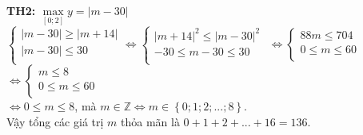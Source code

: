 \begin{ex}
{		\textbf{TH2:} $\max\limits_{[0;2]}y=\left| m-30 \right|$\\
		$\left\{ \begin{matrix}
			\left| m-30 \right|\ge \left| m+14 \right| \\
			\left| m-30 \right|\le 30 \\
		\end{matrix} \right.\Leftrightarrow \left\{ \begin{matrix}
			{{\left| m+14 \right|}^2}\le {{\left| m-30 \right|}^2} \\
			-30\le m-30\le 30 \\
		\end{matrix} \right.$ $\Leftrightarrow \left\{ \begin{matrix}
			88m\le 704 \\
			0\le m\le 60 \\
		\end{matrix} \right.$ $\Leftrightarrow \left\{ \begin{matrix}
			m\le 8 \\
			0\le m\le 60 \\
		\end{matrix} \right.$\\
		$\Leftrightarrow 0\le m\le 8$, mà $m\in \mathbb{Z}\Leftrightarrow m\in \left\{ 0;1;2;...;8 \right\}$.\\
		Vậy tổng các giá trị $m$ thỏa mãn là $0+1+2+...+16=136$.}
\end{ex}


